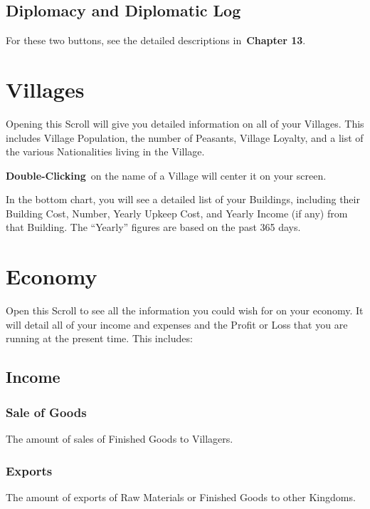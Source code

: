 \subsection{Diplomacy and Diplomatic Log}

For these two buttons, see the detailed descriptions in \textbf{Chapter 13}.

\section{Villages}

Opening this Scroll will give you detailed information on all of your Villages. This includes Village Population, the number of Peasants, Village Loyalty, and a list of the various Nationalities living in the Village.

\textbf{Double-Clicking} on the name of a Village will center it on your screen.

In the bottom chart, you will see a detailed list of your Buildings, including their Building Cost, Number, Yearly Upkeep Cost, and Yearly Income (if any) from that Building. The “Yearly” figures are based on the past 365 days.

\section{Economy}


Open this Scroll to see all the information you could wish for on your economy. It will detail all of your income and expenses and the Profit or Loss that you are running at the present time. This includes:

\subsection{Income}


\subsubsection{Sale of Goods}

The amount of sales of Finished Goods to Villagers.

\subsubsection{Exports}

The amount of exports of Raw Materials or Finished Goods to other Kingdoms.

